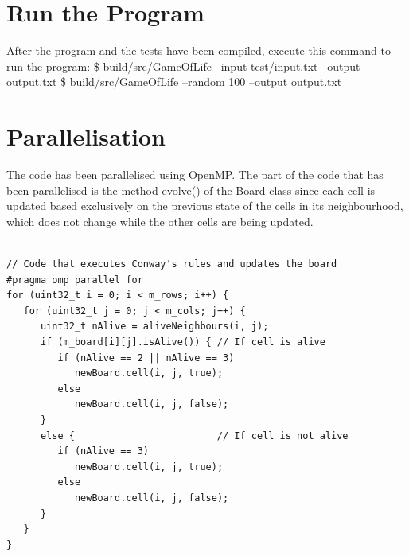\documentclass[a4paper,12pt,twoside]{report}
\begin{document}
\section*{Run the Program}
After the program and the tests have been compiled, execute this command to run the program:
\newline
\$ build/src/GameOfLife --input test/input.txt --output output.txt \newline
\$ build/src/GameOfLife --random 100 --output output.txt
\section*{Parallelisation}
The code has been parallelised using OpenMP. The part of the code that has been parallelised is the method evolve() of the Board class since each cell is updated  based exclusively on the previous state of the cells in its neighbourhood, which does not change while the other cells are being updated.
\begin{lstlisting}

// Code that executes Conway's rules and updates the board
#pragma omp parallel for
for (uint32_t i = 0; i < m_rows; i++) {
   for (uint32_t j = 0; j < m_cols; j++) {
      uint32_t nAlive = aliveNeighbours(i, j);
      if (m_board[i][j].isAlive()) { // If cell is alive
         if (nAlive == 2 || nAlive == 3)
            newBoard.cell(i, j, true);
         else
            newBoard.cell(i, j, false);
	  }
	  else {                         // If cell is not alive
         if (nAlive == 3)
            newBoard.cell(i, j, true);
         else
            newBoard.cell(i, j, false);
      }
   }
}
\end{lstlisting}
\end{document}
